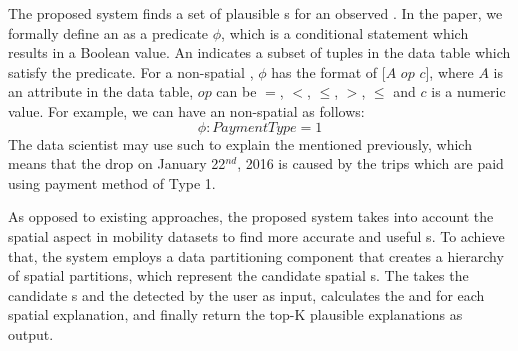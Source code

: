 The proposed system finds a set of plausible {\explanation}s for an observed {\fact}. In the paper, we formally define an {\explanation} as a predicate $\phi$, which is a conditional statement which results in a Boolean value. An {\explanation} indicates a subset of tuples in the data table which satisfy the predicate. For a non-spatial {\explanation}, $\phi$ has the format of $[A$ $op$ $c]$, where $A$ is an attribute in the data table, $op$ can be $=$, $<$, $\leq$, $>$, $\leq$ and $c$ is a numeric value. For example, we can have an non-spatial {\explanation} as follows:
$$\phi: PaymentType = 1$$
The data scientist may use such {\explanation} to explain the {\fact} mentioned previously, which means that the drop on January 22$^{nd}$, 2016 is caused by the trips which are paid using payment method of Type 1.


As opposed to existing approaches, the proposed system takes into account the spatial aspect in mobility datasets to find more accurate and useful {\explanation}s.
To achieve that, the system employs a data partitioning component that creates a hierarchy of spatial partitions, which represent the candidate spatial {\explanation}s. %
The {\evaluator} takes the candidate {\explanation}s and the {\fact} detected by the user as input, calculates the {\intensity} and {\influence} for each spatial explanation, and finally return the top-K plausible explanations as output.





